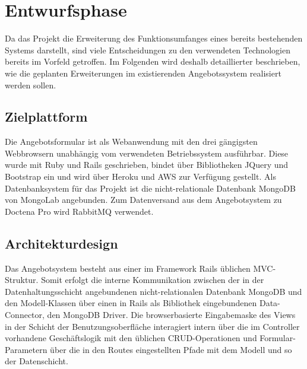 \section{Entwurfsphase} 
\label{sec:Entwurfsphase}
Da das Projekt die Erweiterung des Funktionsumfanges eines bereits bestehenden Systems darstellt, sind viele Entscheidungen zu den verwendeten Technologien bereits im Vorfeld getroffen. Im Folgenden wird deshalb detaillierter beschrieben, wie die geplanten Erweiterungen im existierenden Angebotssystem realisiert werden sollen.

\subsection{Zielplattform}
\label{sec:Zielplattform}

Die Angebotsformular ist als Webanwendung mit den drei gängigsten Webbrowsern unabhängig vom verwendeten Betriebssystem ausführbar. Diese wurde mit Ruby und Rails geschrieben, bindet über Bibliotheken JQuery und Bootstrap ein und wird über Heroku und \ac{AWS} zur Verfügung gestellt. Als Datenbanksystem für das Projekt ist die nicht-relationale Datenbank MongoDB von MongoLab angebunden. Zum Datenversand aus dem Angebotsystem zu Doctena Pro wird RabbitMQ verwendet.

\subsection{Architekturdesign}
\label{sec:Architekturdesign}

Das Angebotsystem besteht aus einer im Framework Rails üblichen \ac{MVC}-Struktur. Somit erfolgt die interne Kommunikation zwischen der in der Datenhaltungsschicht angebundenen nicht-relationalen Datenbank MongoDB und den Modell-Klassen über einen in Rails als Bibliothek eingebundenen Data-Connector, den MongoDB Driver. Die browserbasierte Eingabemaske des Views in der Schicht der Benutzungsoberfläche interagiert intern über die im Controller vorhandene Geschäftslogik mit den üblichen \ac{CRUD}-Operationen und Formular-Parametern über die in den Routes eingestellten Pfade mit dem Modell und so der Datenschicht.

